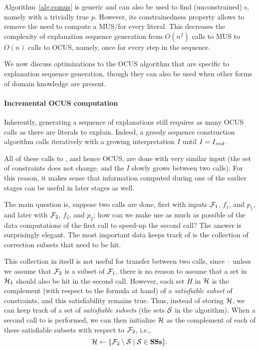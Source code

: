 Algorithm~\ref{alg:comus} is generic and can also be used to find (unconstrained) \omus{}s, namely with a trivially true $p$.
However, its constrainedness property allows to remove the need to compute a MUS/\omus for every literal. This decreases the complexity of explanation sequence generation from $O(n^2)$ calls to MUS to $O(n)$ calls to OCUS, namely, once for every step in the sequence. 

We now discuss optimizations to the OCUS algorithm that are specific to explanation sequence generation, though they can also be used when other forms of domain knowledge are present. 
 
\paragraph{Incremental OCUS computation}
Inherently, generating a sequence of explanations still requires as many OCUS calls as there are literals to explain. 
Indeed, a greedy sequence construction algorithm %
calls \onestepo iteratively with a growing interpretation $I$ until $I=I_\mathit{end} $.

All of these calls to \onestepo, and hence OCUS, are done with very similar input (the set of constraints does not change, and the $I$ slowly grows between two calls). For this reason, it makes sense that information computed during one of the earlier stages can be useful in later stages as well. 

The main question is, suppose two \comus calls are done, first with inputs $\mathcal{F} _1$, $f_1$, and $p_1$, and later with $\mathcal{F} _2$, $f_2$, and $p_2$; how can we make use as much as possible of the data computations of the first call to speed-up the second call? The answer is surprisingly elegant. The most important data \comus keeps track of  is the collection \setstohit of correction subsets that need to be hit.

This collection in itself is not useful for transfer between two calls, since -- unless we assume that $\mathcal{F} _2$ is a subset of $\mathcal{F} _1$, there is no reason to assume that a set in $\mathcal{H}_1$ should also be hit in the second call. 
However, each set $H$ in $\mathcal{H}$ is the complement (with respect to the formula at hand) of a \emph{satisfiable subset} of constraints, and this satisfiability remains true. 
Thus, instead of storing $\mathcal{H}$, we can keep track of a set \satsets of \emph{satisfiable subsets} (the sets $\mathcal{S}$ in the \comus algorithm). 
When a second call to \comus is performed, we can then initialize $\mathcal{H}$ as the complement of each of these satisfiable subsets with respect to $\mathcal{F} _2$, i.e., \[\mathcal{H}\gets \{\mathcal{F} _2\setminus \mathcal{S}\mid \mathcal{S}\in \mathbf{SSs}\}.\]

